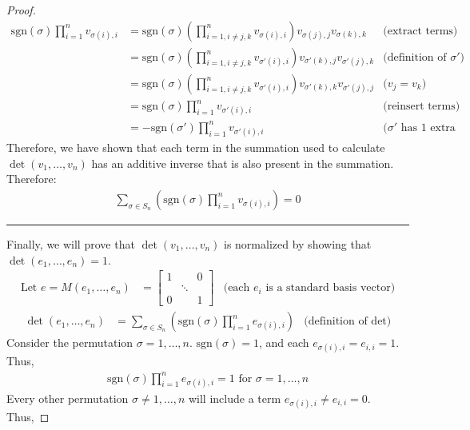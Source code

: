 \documentclass[12pt,reqno]{article}
\newcommand{\divline}{\hrule\vspace{12pt}\noindent}
\newcommand{\sgn}{\mathrm{sgn}}
\theoremstyle{definition}
\begin{document}
\begin{proof}
    \begin{align*}
        \sgn(\sigma)\prod_{i=1}^{n}v_{\sigma(i),i} &= 
        \sgn(\sigma)\left(\prod_{i=1,i \neq j,k}^{n}v_{\sigma(i),i}\right)v_{\sigma(j),j}v_{\sigma(k),k} & \text{(extract terms)}\\
        &= \sgn(\sigma)\left(\prod_{i=1,i\neq j,k}^{n}v_{\sigma'(i),i}\right)v_{\sigma'(k),j}v_{\sigma'(j),k} & \text{(definition of $\sigma'$)}\\
        &= \sgn(\sigma)\left(\prod_{i=1,i\neq j,k}^{n}v_{\sigma'(i),i}\right)v_{\sigma'(k),k}v_{\sigma'(j),j} & \text{($v_j=v_k$)}\\
        &= \sgn(\sigma)\prod_{i=1}^{n}v_{\sigma'(i),i} & \text{(reinsert terms)}\\
        &= -\sgn(\sigma')\prod_{i=1}^{n}v_{\sigma'(i),i} & \text{($\sigma'$ has 1 extra transposition)}
    \end{align*}
    Therefore, we have shown that each term in the summation used to calculate $\det(v_1,\ldots,v_n)$ has an additive inverse that is also present in the summation. Therefore:
    \begin{align*}
        \sum_{\sigma\in S_n}\left(\sgn(\sigma)\prod_{i=1}^{n}v_{\sigma(i),i}\right) = 0
    \end{align*}
    \divline
    Finally, we will prove that $\det(v_1,\ldots,v_n)$ is normalized by showing that $\det(e_1,\ldots,e_n)=1$. 
    \begin{align*}
        \text{Let $e$} = M(e_1,\ldots,e_n) &=
        \begin{bmatrix}
            1 &   & 0 \\
             & \ddots & \\
            0 & & 1
        \end{bmatrix}
        & \text{(each $e_i$ is a standard basis vector)}
    \end{align*}
    \begin{align*}
        \det(e_1,\ldots,e_n) &= \sum_{\sigma\in S_n}\left(\sgn(\sigma)\prod_{i=1}^{n}e_{\sigma(i),i}\right) & \text{(definition of $\det$)}
    \end{align*}
    Consider the permutation $\sigma = 1,\ldots,n$. $\sgn(\sigma) = 1$, and each $e_{\sigma(i),i}=e_{i,i}=1$. Thus, 
    \begin{align*}
        \sgn(\sigma)\prod_{i=1}^{n}e_{\sigma(i),i}=1 \text{ for $\sigma=1,\ldots,n$}
    \end{align*}
    Every other permutation $\sigma\neq 1,\ldots,n$ will include a term $e_{\sigma(i),i}\neq e_{i,i}=0$. Thus,

\end{proof}
\end{document}
